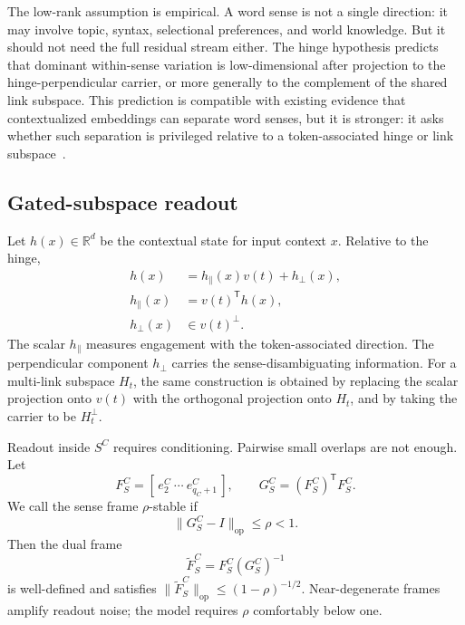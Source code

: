 \documentclass[
  aps,
  reprint,
  superscriptaddress,
  floatfix,
  nofootinbib,
  longbibliography
]{revtex4-2}
\newcommand{\R}{\mathbb{R}}
\newcommand{\T}{^{\mathsf{T}}}
\newcommand{\opnorm}[1]{\lVert #1 \rVert_{\mathrm{op}}}
\newcommand{\hpar}{h_{\parallel}}
\newcommand{\hperp}{h_{\perp}}
\begin{document}
The low-rank assumption is empirical. A word sense is not a single
direction: it may involve topic, syntax, selectional preferences, and
world knowledge. But it should not need the full residual stream
either. The hinge hypothesis predicts that dominant within-sense
variation is low-dimensional after projection to the hinge-perpendicular
carrier, or more generally to the complement of the shared link
subspace. This prediction is compatible with existing evidence that
contextualized embeddings can separate word senses, but it is stronger:
it asks whether such separation is privileged relative to a
token-associated hinge or link subspace~\cite{wiedemann2019does,scarlini2020ares}.

\subsection{Gated-subspace readout}
\label{sec:gated}

Let $h(x)\in\R^d$ be the contextual state for input context $x$.
Relative to the hinge,
%
\begin{align}
\label{eq:hinge-decomp}
h(x)&=\hpar(x)v(t)+\hperp(x),
\\
\hpar(x)&=v(t)\T h(x),  \nonumber
\\
\hperp(x)&\in v(t)^\perp .  \nonumber
\end{align}
%
The scalar $\hpar$ measures engagement with the token-associated
direction. The perpendicular component $\hperp$ carries the
sense-disambiguating information. For a multi-link subspace $H_t$, the
same construction is obtained by replacing the scalar projection onto
$v(t)$ with the orthogonal projection onto $H_t$, and by taking the
carrier to be $H_t^\perp$.

Readout inside $S^C$ requires conditioning. Pairwise small overlaps are
not enough. Let
%
\begin{equation}
F_S^C=[\,e_2^C\ \cdots\ e_{q_C+1}^C\,],
\qquad
G_S^C=(F_S^C)\T F_S^C .
\end{equation}
%
We call the sense frame $\rho$-stable if
%
\begin{equation}
\label{eq:rho-stable}
\opnorm{G_S^C-I}\le \rho<1 .
\end{equation}
%
Then the dual frame
%
\begin{equation}
\label{eq:dual-frame}
\widetilde F_S^C=F_S^C(G_S^C)^{-1}
\end{equation}
%
is well-defined and satisfies
$\opnorm{\widetilde F_S^C}\le(1-\rho)^{-1/2}$. Near-degenerate frames
amplify readout noise; the model requires $\rho$ comfortably below one.
\end{document}
